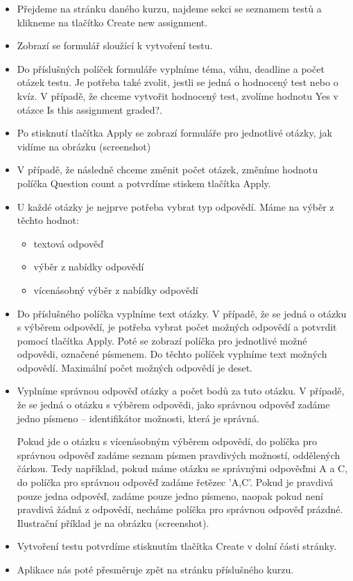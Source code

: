 \begin{itemize}
	\item Přejdeme na stránku daného kurzu, najdeme sekci se seznamem testů a klikneme na tlačítko Create new assignment.
	\item Zobrazí se formulář sloužící k vytvoření testu. 
	\item Do příslušných políček formuláře vyplníme téma, váhu, deadline a počet otázek testu. Je potřeba také zvolit, jestli se jedná o hodnocený test nebo o kvíz. V případě, že chceme vytvořit hodnocený test, zvolíme hodnotu Yes v otázce Is this assignment graded?.
	\item Po stisknutí tlačítka Apply se zobrazí formuláře pro jednotlivé otázky, jak vidíme na obrázku (screenshot)
	\item V případě, že následně chceme změnit počet otázek, změníme hodnotu políčka Question count a potvrdíme stiskem tlačítka Apply.
	\item U každé otázky je nejprve potřeba vybrat typ odpovědí. Máme na výběr z těchto hodnot:
		\begin{itemize}
			\item textová odpověď
			\item výběr z nabídky odpovědí
			\item vícenásobný výběr z nabídky odpovědí
		\end{itemize}
	\item Do příslušného políčka vyplníme text otázky. V případě, že se jedná o otázku s výběrem odpovědí, je potřeba vybrat počet možných odpovědí a potvrdit pomocí tlačítka Apply. Poté se zobrazí políčka pro jednotlivé možné odpovědi, označené písmenem. Do těchto políček vyplníme text možných odpovědí. Maximální počet možných odpovědí je deset.
	\item Vyplníme správnou odpověď otázky a počet bodů za tuto otázku. V případě, že se jedná o otázku s výběrem odpovědi, jako správnou odpověď zadáme jedno písmeno -- identifikátor možnosti, která je správná. 
	
	Pokud jde o otázku s vícenásobným výběrem odpovědí, do políčka pro správnou odpověď zadáme seznam písmen pravdivých možností, oddělených čárkou. Tedy například, pokud máme otázku se správnými odpověďmi A a C, do políčka pro správnou odpověď zadáme řetězec 'A,C'. Pokud je pravdivá pouze jedna odpověď, zadáme pouze jedno písmeno, naopak pokud není pravdivá žádná z odpovědí, necháme políčka pro správnou odpověď prázdné. Ilustrační příklad je na obrázku (screenshot).
	\item Vytvoření testu potvrdíme stisknutím tlačítka Create v dolní části stránky.
	\item Aplikace nás poté přesměruje zpět na stránku příslušného kurzu.
\end{itemize}

